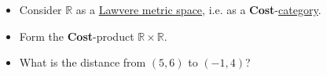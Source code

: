 \begin{itemize}
    \item  Consider $\mathbb{R}$ as a \href{doc/1 math/Seven Sketches in Compositionality/Chapter 2: Resource theories/3 Enrichment/3 Lawvere metric spaces/2 Lawvere metric space}{Lawvere metric space}, i.e. as a \textbf{Cost}-\href{doc/1 math/Seven Sketches in Compositionality/Chapter 2: Resource theories/3 Enrichment/1 V-categories/1 V-category}{category}.
    \item Form the \textbf{Cost}-product $\mathbb{R}\times\mathbb{R}$.
    \item What is the distance from $(5,6)$ to $(-1,4)$?
  \end{itemize}